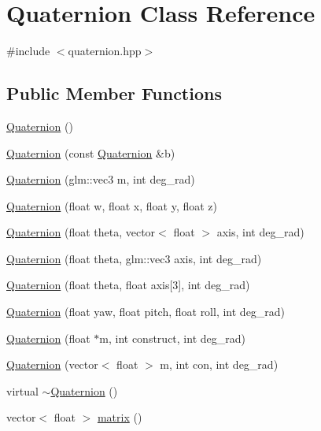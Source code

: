\hypertarget{classQuaternion}{\section{Quaternion Class Reference}
\label{classQuaternion}
}


{\ttfamily \#include $<$quaternion.\-hpp$>$}

\subsection*{Public Member Functions}
\begin{DoxyCompactItemize}
\item 
\hyperlink{classQuaternion_abcc01358aada56ea5f0db4da18aaf77d}{Quaternion} ()
\item 
\hyperlink{classQuaternion_a84c0cdc8392ec36aeb2679450a62210c}{Quaternion} (const \hyperlink{classQuaternion}{Quaternion} \&b)
\item 
\hyperlink{classQuaternion_a21e79c69edf08f4a22d634cbff8aa457}{Quaternion} (glm\-::vec3 m, int deg\-\_\-rad)
\item 
\hyperlink{classQuaternion_ab13d6ced50c96438115b30cb91fc7d6c}{Quaternion} (float w, float x, float y, float z)
\item 
\hyperlink{classQuaternion_afe6d67aea9571b86269759a5dcbbd5b1}{Quaternion} (float theta, vector$<$ float $>$ axis, int deg\-\_\-rad)
\item 
\hyperlink{classQuaternion_a9e5ad1650f41df892911653e6e4fc05c}{Quaternion} (float theta, glm\-::vec3 axis, int deg\-\_\-rad)
\item 
\hyperlink{classQuaternion_a951d6f03907e0fd81f87a821aa65eed1}{Quaternion} (float theta, float axis\mbox{[}3\mbox{]}, int deg\-\_\-rad)
\item 
\hyperlink{classQuaternion_af2d1bdc0d28bb9630259514d34a89b13}{Quaternion} (float yaw, float pitch, float roll, int deg\-\_\-rad)
\item 
\hyperlink{classQuaternion_a41f8e0ddc6e7f3fc93a55083e4674bae}{Quaternion} (float $\ast$m, int construct, int deg\-\_\-rad)
\item 
\hyperlink{classQuaternion_a458226b80dece68afe44fcd5cc460ae0}{Quaternion} (vector$<$ float $>$ m, int con, int deg\-\_\-rad)
\item 
virtual \hyperlink{classQuaternion_a5f834c2ca469cd71edc8a23fdc3f56e8}{$\sim$\-Quaternion} ()
\item 
vector$<$ float $>$ \hyperlink{classQuaternion_a10c72e67c80150f4419be5a616575ca4}{matrix} ()

\end{DoxyCompactItemize}
